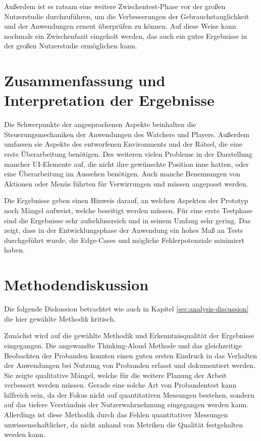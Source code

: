 Außerdem ist es ratsam eine weitere Zwischentest-Phase vor der großen Nutzerstudie durchzuführen, um die Verbesserungen der Gebrauchstauglichkeit und der Anwendungen erneut überprüfen zu können. Auf diese Weise kann nochmals ein Zwischenfazit eingeholt werden, das auch ein gutes Ergebnisse in der großen Nutzerstudie ermöglichen kann.

\section{Zusammenfassung und Interpretation der Ergebnisse}
Die Schwerpunkte der angesprochenen Aspekte beinhalten die Steuerungsmechaniken der Anwendungen des Watchers und Players. Außerdem umfassen sie Aspekte des entworfenen Environments und der Rätsel, die eine erste Überarbeitung benötigen. Des weiteren vielen Probleme in der Darstellung mancher \ac{UI}-Elemente auf, die nicht ihre gewünschte Position inne hatten, oder eine Überarbeitung im Aussehen benötigen. Auch manche Benennungen von Aktionen oder Menüs führten für Verwirrungen und müssen angepasst werden.

Die Ergebnisse geben einen Hinweis darauf, an welchen Aspekten der Prototyp noch Mängel aufweist, welche beseitigt werden müssen. Für eine erste Testphase sind die Ergebnisse sehr aufschlussreich und in seinem Umfang sehr gering. Das zeigt, dass in der Entwicklungsphase der Anwendung ein hohes Maß an Tests durchgeführt wurde, die Edge-Cases und mögliche Fehlerpotenziale minimiert haben.

\section{Methodendiskussion}
Die folgende Diskussion betrachtet wie auch in Kapitel \ref{sec:analysis-discussion} die hier gewählte Methodik kritisch.

Zunächst wird auf die gewählte Methodik und Erkenntnisqualität der Ergebnisse eingegangen.
Die angewandte Thinking-Aloud Methode und das gleichzeitige Beobachten der Probanden konnten einen guten ersten Eindruck in das Verhalten der Anwendungen bei Nutzung von Probanden erfasst und dokumentiert werden. Sie zeigte qualitative Mängel, welche für die weitere Planung der Arbeit verbessert werden müssen. Gerade eine solche Art von Probandentest kann hilfreich sein, da der Fokus nicht auf quantitativen Messungen bestehen, sondern auf das tiefere Verständnis der Nutzerwahrnehmung eingegangen werden kann. Allerdings ist diese Methodik durch das Fehlen quantitativer Messungen unwissenschaftlicher, da nicht anhand von Metriken die Qualität festgehalten werden kann.

